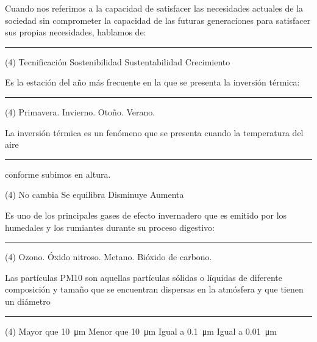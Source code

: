 \documentclass[12pt, letter]{exam}
\begin{document}
\begin{questions}
    \question Cuando nos referimos a la capacidad de satisfacer las necesidades actuales de la sociedad sin comprometer la capacidad de las futuras generaciones para satisfacer sus propias necesidades, hablamos de: \rule{2cm}{0.1mm}
    \begin{tasks}(4)
        \task Tecnificación
        \task Sostenibilidad
        \task Sustentabilidad
        \task Crecimiento
    \end{tasks}
    \question Es la estación del año más frecuente en la que se presenta la inversión térmica: \rule{2cm}{0.1mm}
    \begin{tasks}(4)
        \task Primavera.
        \task Invierno.
        \task Otoño.
        \task Verano.
    \end{tasks}
    \question La inversión térmica es un fenómeno que se presenta cuando la temperatura del aire \rule{2cm}{0.1mm} conforme subimos en altura.
    \begin{tasks}(4)
        \task No cambia
        \task Se equilibra
        \task Disminuye
        \task Aumenta
    \end{tasks}
    \question Es uno de los principales gases de efecto invernadero que es emitido por los humedales y los rumiantes durante su proceso digestivo: \rule{2cm}{0.1mm}
    \begin{tasks}(4)
        \task Ozono.
        \task Óxido nitroso.
        \task Metano.
        \task Bióxido de carbono.
    \end{tasks}
    \question Las partículas PM10 son aquellas partículas sólidas o líquidas de diferente composición y tamaño que se encuentran dispersas en la atmósfera y que tienen un diámetro \rule{2cm}{0.1mm}
    \begin{tasks}(4)
        \task Mayor que \SI{10}{\micro\meter}
        \task Menor que \SI{10}{\micro\meter}
        \task Igual a \SI{0.1}{\micro\meter}
        \task Igual a \SI{0.01}{\micro\meter}
    \end{tasks}
\end{questions}
\end{document}
